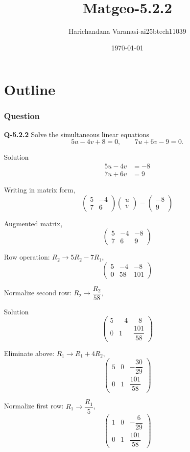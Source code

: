 \documentclass{beamer}
\title{Matgeo-5.2.2}
\author{Harichandana Varanasi-ai25btech11039}
\date{\today}
\theoremstyle{remark}
\newcommand{\myvec}[1]{\ensuremath{\begin{pmatrix}#1\end{pmatrix}}}
\begin{document}
\begin{frame}
\titlepage
\end{frame}

\section*{Outline}

\begin{frame}
\frametitle{Question}

\noindent\textbf{Q-5.2.2} \;
Solve the simultaneous linear equations
\[
5u-4v+8=0,\qquad 7u+6v-9=0 .
\]

\end{frame}
\begin{frame}{Solution}
   \renewcommand\theequation{\arabic{equation}}
\begin{align}
5u - 4v &= -8 \tag{1}\\
7u + 6v &= 9 \tag{2}
\end{align}

Writing in matrix form,
\begin{equation}
\myvec{5 & -4 \\ 7 & 6}\myvec{u \\ v}=\myvec{-8 \\ 9} \tag{3}
\end{equation}

Augmented matrix,
\begin{equation}
\myvec{5 & -4 & -8 \\ 7 & 6 & 9} \tag{4}
\end{equation}

\noindent Row operation: $R_2 \to 5R_2 - 7R_1$,
\begin{equation}
\myvec{5 & -4 & -8 \\ 0 & 58 & 101} \tag{5}
\end{equation}

\noindent Normalize second row: $R_2 \to \dfrac{R_2}{58}$,
\end{frame}
\begin{frame}{Solution}
\begin{equation}
\myvec{5 & -4 & -8 \\ 0 & 1 & \dfrac{101}{58}} \tag{6}
\end{equation}

\noindent Eliminate above: $R_1 \to R_1 + 4R_2$,
\begin{equation}
\myvec{5 & 0 & -\dfrac{30}{29} \\ 0 & 1 & \dfrac{101}{58}} \tag{7}
\end{equation}

\noindent Normalize first row: $R_1 \to \dfrac{R_1}{5}$,
\begin{equation}
\myvec{1 & 0 & -\dfrac{6}{29} \\ 0 & 1 & \dfrac{101}{58}} \tag{8}
\end{equation}
\end{frame}
\end{document}
